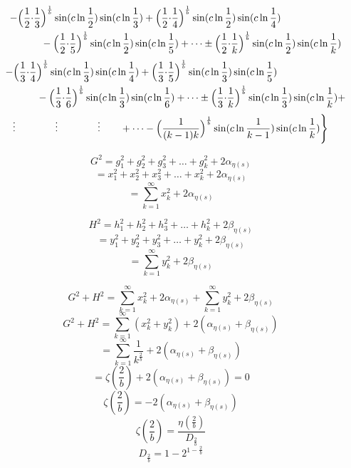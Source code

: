 \documentclass{amsart}
\begin{document}
	\[
	\begin{aligned}
		\quad - \Bigl( \frac{1}{2} {\cdot} \frac{1}{3}& \Bigr)^\frac1b \sin(c \ln \frac{1}{2}) \sin(c \ln \frac{1}{3}) + \Bigl( \frac{1}{2} {\cdot} \frac{1}{4} \Bigr)^\frac1b \sin(c \ln \frac{1}{2}) \sin(c \ln \frac{1}{4}) \\ 
		& - \Bigl( \frac{1}{2} {\cdot} \frac{1}{5} \Bigr)^\frac1b \sin(c \ln \frac{1}{2}) \sin(c \ln \frac{1}{5}) + \dots \pm \Bigl( \frac{1}{2} {\cdot} \frac{1}{k} \Bigr)^\frac1b \sin(c \ln \frac{1}{2}) \sin(c \ln \frac{1}{k}) \\
	\end{aligned}
	\]
	\[
	\begin{aligned}
		\quad - \Bigl( \frac{1}{3} {\cdot} \frac{1}{4}& \Bigr)^\frac1b \sin(c \ln \frac{1}{3}) \sin(c \ln \frac{1}{4}) + \Bigl( \frac{1}{3} {\cdot} \frac{1}{5} \Bigr)^\frac1b \sin(c \ln \frac{1}{3}) \sin(c \ln \frac{1}{5}) \\
		& - \Bigl( \frac{1}{3} {\cdot} \frac{1}{6} \Bigr)^\frac1b \sin(c \ln \frac{1}{3}) \sin(c \ln \frac{1}{6}) + \dots \pm \Bigl( \frac{1}{3} {\cdot} \frac{1}{k} \Bigr)^\frac1b \sin(c \ln \frac{1}{3}) \sin(c \ln \frac{1}{k}) + \\ 		
	\end{aligned}
	\]
	\[
	\begin{aligned}
		\vdots \qquad\qquad \vdots \qquad\qquad \vdots \qquad + \dots - \Bigl( \frac{1}{(k-1)k} \Bigr)^\frac1b \sin(c \ln \frac{1}{k-1}) \sin(c \ln \frac{1}{k}) \Biggr\}
	\end{aligned}
	\]
	
	\[ G^2 = g_1^2 + g_2^2 + g_3^2 + \dots + g_k^2 + 2\alpha_{\eta(s)} \]
	\[ = x_1^2 + x_2^2 + x_3^2 + \dots + x_k^2 + 2\alpha_{\eta(s)} \]
	\[ = \sum\limits_{k=1}^{\infty}x_k^2 + 2\alpha_{\eta(s)} \]
	
	\[ H^2 = h_1^2 + h_2^2 + h_3^2 + \dots + h_k^2 + 2\beta_{\eta(s)} \]
	\[ = y_1^2 + y_2^2 + y_3^2 + \dots + y_k^2 + 2\beta_{\eta(s)} \]
	\[ = \sum\limits_{k=1}^{\infty}y_k^2 + 2\beta_{\eta(s)} \]
	
	\[ G^2 + H^2 = \sum\limits_{k=1}^{\infty}x_k^2 + 2\alpha_{\eta(s)} + \sum\limits_{k=1}^{\infty}y_k^2 + 2\beta_{\eta(s)} \]
	\[ G^2 + H^2 = \sum\limits_{k=1}^{\infty}(x_k^2 + y_k^2) + 2(\alpha_{\eta(s)} + \beta_{\eta(s)}) \]
	\[ = \sum\limits_{k=1}^{\infty}\frac{1}{k^{\frac{2}{b}}} + 2(\alpha_{\eta(s)} + \beta_{\eta(s)}) \]
	\[ = \zeta(\frac{2}{b}) + 2(\alpha_{\eta(s)} + \beta_{\eta(s)}) = 0 \]
	\[ \zeta(\frac{2}{b}) = - 2(\alpha_{\eta(s)} + \beta_{\eta(s)}) \]
	\[ \zeta(\frac{2}{b}) = \frac{\eta( \frac{2}{b} )}{D_{\frac{2}{b}}} \]
	\[ D_{\frac{2}{b}} = 1 - 2^{1-\frac{2}{b}} \]
	
\end{document}

